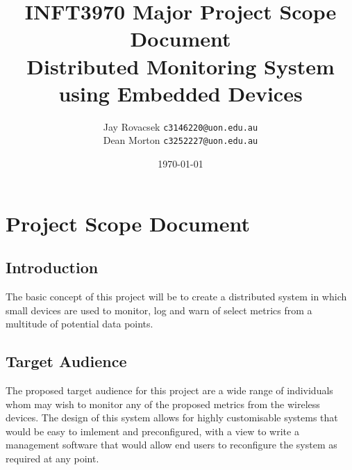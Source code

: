 \documentclass{article}
\title{INFT3970 Major Project Scope Document \protect\\
    Distributed Monitoring System using Embedded Devices}
\author{
        Jay Rovacsek
        \texttt{c3146220@uon.edu.au}\\
        Dean Morton
        \texttt{c3252227@uon.edu.au}
    }
\date{\today}
\begin{document}
    \begin{titlingpage}
        \maketitle
    \end{titlingpage}
    \newpage
    \tableofcontents
    \newpage
    
    \section{Project Scope Document}
        \subsection{Introduction}
        The basic concept of this project will be to create a distributed system in which small 
        devices are used to monitor, log and warn of select metrics from a multitude of 
        potential data points.
        \subsection{Target Audience}
        The proposed target audience for this project are a wide range of individuals whom may
        wish to monitor any of the proposed metrics from the wireless devices. The design
        of this system allows for highly customisable systems that would be easy to imlement and 
        preconfigured, with a view to write a management software that would allow end users to
        reconfigure the system as required at any point.
\end{document}
